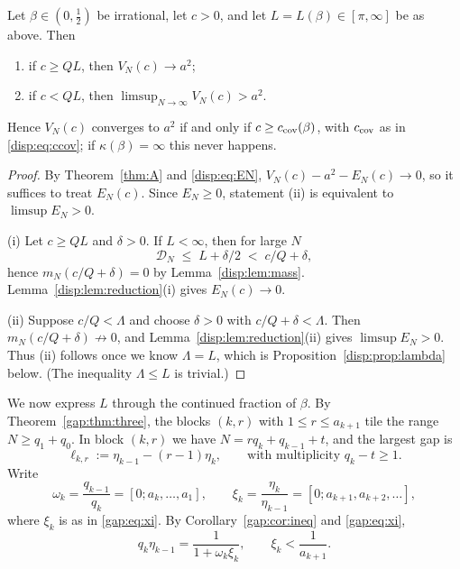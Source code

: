 \begin{theorem}\label{disp:thm:iff}
Let $\beta\in(0,\frac12)$ be irrational, let $c>0$, and let $L=L(\beta)\in[\pi,\infty]$ be as above. Then
\begin{enumerate}
\item[(i)] if $c\ge QL$, then $V_N(c)\to a^2$;
\item[(ii)] if $c<QL$, then $\limsup_{N\to\infty} V_N(c)>a^2$.
\end{enumerate}
Hence $V_N(c)$ converges to $a^2$ if and only if $c\ge c_{\rm cov}(\beta)$, with $c_{\rm cov}$ as in \eqref{disp:eq:ccov}; if $\kappa(\beta)=\infty$ this never happens.
\end{theorem}
\begin{proof}
By Theorem~\ref{thm:A} and \eqref{disp:eq:EN}, $V_N(c)-a^2-E_N(c)\to0$, so it suffices to treat $E_N(c)$. Since $E_N\ge0$, statement (ii) is equivalent to $\limsup E_N>0$.

(i) Let $c\ge QL$ and $\delta>0$. If $L<\infty$, then for large $N$
\[
\mathcal D_N\;\le\;L+\delta/2\;<\;c/Q+\delta ,
\]
hence $m_N(c/Q+\delta)=0$ by Lemma~\ref{disp:lem:mass}. Lemma~\ref{disp:lem:reduction}(i) gives $E_N(c)\to0$.

(ii) Suppose $c/Q<\Lambda$ and choose $\delta>0$ with $c/Q+\delta<\Lambda$. Then $m_N(c/Q+\delta)\not\to0$, and
Lemma~\ref{disp:lem:reduction}(ii) gives $\limsup E_N>0$. Thus (ii) follows once we know $\Lambda=L$, which is Proposition~\ref{disp:prop:lambda} below. (The inequality $\Lambda\le L$ is trivial.)
\end{proof}

We now express $L$ through the continued fraction of $\beta$. By Theorem~\ref{gap:thm:three}, the blocks
$(k,r)$ with $1\le r\le a_{k+1}$ tile the range $N\ge q_1+q_0$. In block $(k,r)$ we have $N=rq_k+q_{k-1}+t$, and the largest gap is
\begin{equation}\label{disp:eq:ell}
\ell_{k,r}:=\eta_{k-1}-(r-1)\eta_k ,\qquad\text{with multiplicity } q_k-t\ge1 .
\end{equation}
Write
\[
\omega_k=\frac{q_{k-1}}{q_k}=[0;a_k,\dots,a_1],\qquad
\xi_k=\frac{\eta_k}{\eta_{k-1}}=[0;a_{k+1},a_{k+2},\dots],
\]
where $\xi_k$ is as in \eqref{gap:eq:xi}. By Corollary~\ref{gap:cor:ineq} and \eqref{gap:eq:xi},
\begin{equation}\label{disp:eq:omegaxi}
q_k\eta_{k-1}=\frac1{1+\omega_k\xi_k},\qquad \xi_k<\frac1{a_{k+1}} .
\end{equation}


